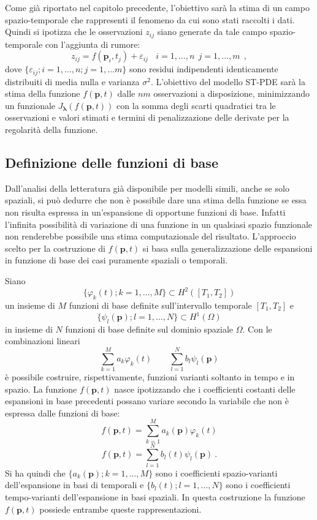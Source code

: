\documentclass[a4paper,11pt,twoside,openright]{book}							%
\begin{document}
Come già riportato nel capitolo precedente, l'obiettivo sarà la stima di un campo spazio-temporale che rappresenti il fenomeno da cui sono stati raccolti i dati. Quindi si ipotizza che le osservazioni $z_{ij}$ siano generate da tale campo spazio-temporale con l'aggiunta di rumore:
\begin{equation}
\label{eq:modellobase}
z_{ij}=f(\bm p_i,t_j)+\varepsilon_{ij}\ \ \ \ i = 1,\ldots,n\ \ j=1,\ldots,m \ \ ,
\end{equation}
dove $\{ \varepsilon_{ij}; i = 1,\ldots ,n; j=1,\ldots m\}$ sono residui indipendenti identicamente distribuiti di media nulla e varianza $\sigma^2$. L'obiettivo del modello ST-PDE sarà la stima della funzione $f(\bm p,t)$ dalle $nm$ osservazioni a disposizione, minimizzando un funzionale $J_{\bm \lambda }(f(\bm p,t))$ con la somma degli scarti quadratici tra le osservazioni e valori stimati e termini di penalizzazione delle derivate per la regolarità della funzione.



\subsection{Definizione delle funzioni di base}
\label{subs:basi}

Dall'analisi della letteratura già disponibile per modelli simili, anche se solo spaziali, si può dedurre che non è possibile dare una stima della funzione se essa non risulta espressa in un'espansione di opportune funzioni di base. Infatti l'infinita possibilità di variazione di una funzione in un qualsiasi spazio funzionale non renderebbe possibile una stima computazionale del risultato. L'approccio scelto per la costruzione di $f(\bm p,t)$ si basa sulla generalizzazione delle espansioni in funzione di base dei casi puramente spaziali o temporali.

Siano 
$$
\{ \varphi_k(t);k=1, \ldots , M \} \subset H^2([T_1,T_2])
$$
un insieme di $M$ funzioni di base definite sull'intervallo temporale $[T_1,T_2]$ e
$$
\{ \psi_l(\bm p);l=1, \ldots , N \} \subset H^1(\Omega)
$$
in insieme di $N$ funzioni di base definite sul dominio spaziale $\Omega$. Con le combinazioni lineari
$$
\sum_{k=1}^M a_k\varphi_k(t) \qquad \sum_{l=1}^N b_l\psi_l(\bm p)
$$
è possibile costruire, rispettivamente, funzioni varianti soltanto in tempo e in spazio. La funzione $f(\bm p,t)$ nasce ipotizzando che i coefficienti costanti delle espansioni in base precedenti possano variare secondo la variabile che non è espressa dalle funzioni di base:
\begin{equation} 
\label{eq:f_temp}
f(\bm p, t) = \sum_{k=1}^M a_k(\bm p)\varphi_k(t)
\end{equation}
\begin{equation}
\label{eq:f_space}
f(\bm p, t) = \sum_{l=1}^N b_l(t)\psi_l(\bm p) \ .
\end{equation}
Si ha quindi che $\{ a_k(\bm p);k=1, \ldots , M \}$ sono i coefficienti spazio-varianti dell'espansione in basi di temporali e $\{ b_l(t);l=1, \ldots , N \}$ sono i coefficienti tempo-varianti dell'espansione in basi spaziali. In questa costruzione la funzione $f(\bm p,t)$ possiede entrambe queste rappresentazioni.
\end{document}
